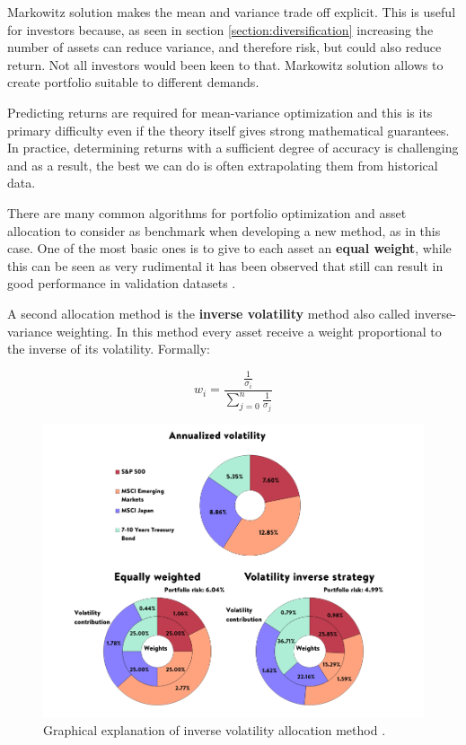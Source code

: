 Markowitz solution makes the mean and variance trade off explicit. This is useful for investors because, as seen in section \ref{section:diversification} increasing the number of assets can reduce variance, and therefore risk, but could also reduce return. Not all investors would been keen to that. Markowitz solution allows to create portfolio suitable to different demands.

\hfill \break

Predicting returns are required for mean-variance optimization and this is its primary difficulty even if the theory itself gives strong mathematical guarantees.
In practice, determining returns with a sufficient degree of accuracy is challenging and as
a result, the best we can do is often extrapolating them from historical data.

\hfill \break


There are many common algorithms for portfolio optimization and asset allocation to consider as benchmark when developing a new method, as in this case. One of the most basic ones is to give to each asset an \textbf{equal weight}, while this can be seen as very rudimental it has been observed that still can result in good performance in validation datasets \cite{PFLUG2012410} \cite{demiguel2009} \cite{duchin2009markowitz}. 

\hfill \break

A second allocation method is the \textbf{inverse volatility} method also called inverse-variance weighting. In this method every asset receive a weight proportional to the inverse of its volatility. Formally: 

$$ w_i = \frac{\frac{1}{\sigma_i}}{ \sum\limits_{j=0}^n \frac{1}{\sigma_j} } $$

\begin{figure}[h]
    \centering
    \includegraphics[width=\textwidth]{cap2/Volatility_inverse-Explanation.png}
    \caption[Inverse volatility allocation method]{Graphical explanation of inverse volatility allocation method \cite{fuertes2017}.}
    \label{volatility_inverse}
\end{figure}

